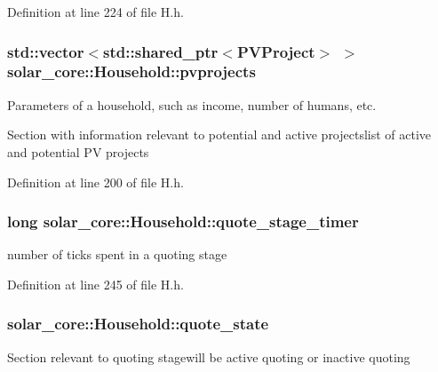 Definition at line 224 of file H.\+h.

\hypertarget{classsolar__core_1_1_household_a79c0e955af98669487e0fb472811f842}{}
\subsubsection[{pvprojects}]{\setlength{\rightskip}{0pt plus 5cm}std\+::vector$<$std\+::shared\+\_\+ptr$<${\bf P\+V\+Project}$>$ $>$ solar\+\_\+core\+::\+Household\+::pvprojects\hspace{0.3cm}{\ttfamily [protected]}}\label{classsolar__core_1_1_household_a79c0e955af98669487e0fb472811f842}
Parameters of a household, such as income, number of humans, etc.

Section with information relevant to potential and active projectslist of active and potential P\+V projects 

Definition at line 200 of file H.\+h.

\hypertarget{classsolar__core_1_1_household_a6b35426fd691daa6d352ec34a6ec6e4d}{}
\subsubsection[{quote\+\_\+stage\+\_\+timer}]{\setlength{\rightskip}{0pt plus 5cm}long solar\+\_\+core\+::\+Household\+::quote\+\_\+stage\+\_\+timer\hspace{0.3cm}{\ttfamily [protected]}}\label{classsolar__core_1_1_household_a6b35426fd691daa6d352ec34a6ec6e4d}
number of ticks spent in a quoting stage 

Definition at line 245 of file H.\+h.

\hypertarget{classsolar__core_1_1_household_a4ae618de9a28895317824b185b57ab24}{}
\subsubsection[{quote\+\_\+state}]{ solar\+\_\+core\+::\+Household\+::quote\+\_\+state\hspace{0.3cm}{\ttfamily [protected]}}\label{classsolar__core_1_1_household_a4ae618de9a28895317824b185b57ab24}
Section relevant to quoting stagewill be active quoting or inactive quoting 

